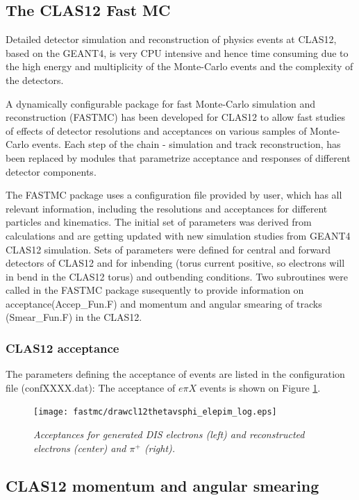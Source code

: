 \subsection{The CLAS12 Fast MC}

Detailed detector simulation and reconstruction of physics events at CLAS12,
based on the GEANT4, is very CPU intensive and hence time consuming due to 
the high energy and multiplicity of the Monte-Carlo events and the complexity of the detectors. 

A dynamically configurable package for fast Monte-Carlo simulation and reconstruction (FASTMC) 
has been developed for CLAS12 to allow fast studies of effects of detector resolutions 
and acceptances on various samples of Monte-Carlo events. 
Each step of the chain - simulation and track reconstruction, 
has been replaced by modules that parametrize acceptance and responses of different 
detector components.

The FASTMC package uses a configuration file provided by user, which has all relevant information,
including the resolutions and acceptances for different particles and kinematics.
The initial set of parameters was derived from calculations and are getting updated with
new simulation studies from GEANT4 CLAS12 simulation.
Sets of parameters were defined for central and forward detectors of CLAS12 and for inbending
(torus current positive, so electrons will in bend in the CLAS12 torus) and outbending conditions.
Two subroutines were called in the FASTMC package susequently to provide information
on acceptance(Accep\_Fun.F) and momentum and angular smearing of tracks (Smear\_Fun.F) in the 
CLAS12. 

\subsubsection{CLAS12 acceptance}

The parameters defining the acceptance of events are listed in the configuration 
file (confXXXX.dat):
The acceptance of $e\pi X$ events is shown on Figure \ref{fig:accept}.
\begin{figure}[htbp] %
   \centering
   \texttt{[image: fastmc/drawcl12thetavsphi\_elepim\_log.eps]} 
   \caption{\it Acceptances for generated DIS electrons (left) and reconstructed electrons (center)
and $\pi^+$ (right).
}
\label{fig:accept}
 \end{figure}

\subsection{CLAS12 momentum and angular smearing}

